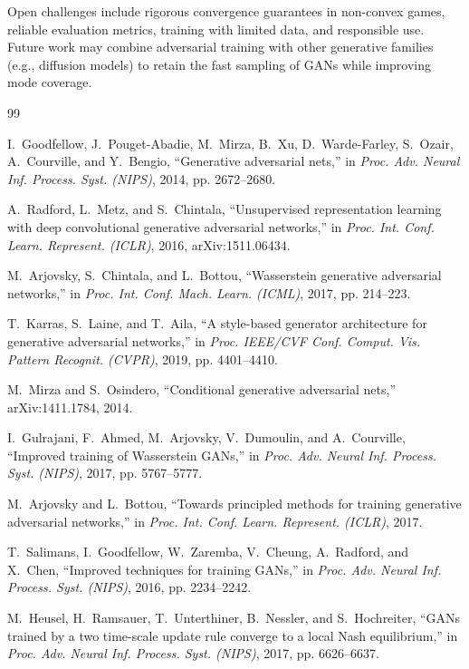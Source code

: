 \documentclass[conference]{IEEEtran}
\theoremstyle{plain}
\theoremstyle{definition}
\begin{document}
Open challenges include rigorous convergence guarantees in non-convex games, reliable evaluation metrics, training with limited data, and responsible use. Future work may combine adversarial training with other generative families (e.g., diffusion models) to retain the fast sampling of GANs while improving mode coverage.

\begin{thebibliography}{99}

 I.~Goodfellow, J.~Pouget-Abadie, M.~Mirza, B.~Xu, D.~Warde-Farley, S.~Ozair, A.~Courville, and Y.~Bengio, ``Generative adversarial nets,'' in \emph{Proc. Adv. Neural Inf. Process. Syst. (NIPS)}, 2014, pp. 2672--2680.

 A.~Radford, L.~Metz, and S.~Chintala, ``Unsupervised representation learning with deep convolutional generative adversarial networks,'' in \emph{Proc. Int. Conf. Learn. Represent. (ICLR)}, 2016, arXiv:1511.06434.

 M.~Arjovsky, S.~Chintala, and L.~Bottou, ``Wasserstein generative adversarial networks,'' in \emph{Proc. Int. Conf. Mach. Learn. (ICML)}, 2017, pp. 214--223.

 T.~Karras, S.~Laine, and T.~Aila, ``A style-based generator architecture for generative adversarial networks,'' in \emph{Proc. IEEE/CVF Conf. Comput. Vis. Pattern Recognit. (CVPR)}, 2019, pp. 4401--4410.

 M.~Mirza and S.~Osindero, ``Conditional generative adversarial nets,'' arXiv:1411.1784, 2014.

 I.~Gulrajani, F.~Ahmed, M.~Arjovsky, V.~Dumoulin, and A.~Courville, ``Improved training of Wasserstein GANs,'' in \emph{Proc. Adv. Neural Inf. Process. Syst. (NIPS)}, 2017, pp. 5767--5777.

 M.~Arjovsky and L.~Bottou, ``Towards principled methods for training generative adversarial networks,'' in \emph{Proc. Int. Conf. Learn. Represent. (ICLR)}, 2017.

 T.~Salimans, I.~Goodfellow, W.~Zaremba, V.~Cheung, A.~Radford, and X.~Chen, ``Improved techniques for training GANs,'' in \emph{Proc. Adv. Neural Inf. Process. Syst. (NIPS)}, 2016, pp. 2234--2242.

 M.~Heusel, H.~Ramsauer, T.~Unterthiner, B.~Nessler, and S.~Hochreiter, ``GANs trained by a two time-scale update rule converge to a local Nash equilibrium,'' in \emph{Proc. Adv. Neural Inf. Process. Syst. (NIPS)}, 2017, pp. 6626--6637.


\end{thebibliography}
\end{document}
